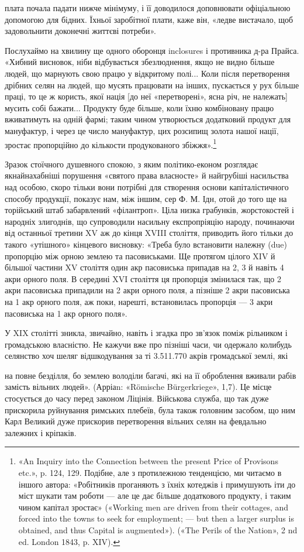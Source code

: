 плата почала падати нижче мінімуму, і її доводилося доповнювати
офіціальною допомогою для бідних. Їхньої заробітної плати,
каже він, «ледве вистачало, щоб задовольнити доконечні життєві
потреби».

Послухаймо на хвилину ще одного оборонця inclosures і противника
д-ра Прайса. «Хибний висновок, ніби відбувається
збезлюднення, якщо не видно більше людей, що марнують свою
працю у відкритому полі... Коли після перетворення дрібних
селян на людей, що мусять працювати на інших, пускається у
рух більше праці, то це ж користь, якої нація [до неї «перетворені»,
ясна річ, не належать] мусить собі бажати... Продукту
буде більше, коли їхню комбіновану працю вживатимуть на
одній фармі; таким чином утворюється додатковий продукт для
мануфактур, і через це число мануфактур, цих розсипищ золота
нашої нації, зростає пропорційно до кількости продукованого
збіжжя».\footnote{
«An Inquiry into the Connection between the present Price of
Provisons etc.», p. 124, 129. Подібне, але з протилежною тенденцією, ми
читаємо в іншого автора: «Робітників проганяють з їхніх котеджів і
примушують іти до міст шукати там роботи — але це дає більше додаткового
продукту, і таким чином капітал зростає» («Working men are driven
from their cottages, and forced into the towns to seek for employment; —
but then a larger surplus is obtained, and thus Capital is augmented»).
(«The Perils of the Nation», 2 nd ed. London 1843, p. XIV).
}

Зразок стоїчного душевного спокою, з яким політико-економ
розглядає якнайнахабніші порушення «святого права власносте»
й найгрубіші насильства над особою, скоро тільки вони
потрібні для створення основи капіталістичного способу продукції,
показує нам, між іншим, сер Ф. М. Ідн, отой до того
ще на торійський штаб забарвлений «філантроп». Ціла низка грабунків,
жорстокостей і народніх злигоднів, що супроводили насильну
експропріяцію народу, починаючи від останньої третини
XV аж до кінця XVIII століття, приводить його тільки до
такого «утішного» кінцевого висновку: «Треба було встановити
належну (due) пропорцію між орною землею та пасовиськами.
Ще протягом цілого XIV й більшої частини XV століття
один акр пасовиська припадав на 2, 3 й навіть 4 акри орного
поля. В середині XVI століття ця пропорція змінилася так, що
2 акри пасовиська припадили на 2 акри орного поля, а пізніше
2 акри пасовиська на 1 акр орного поля, аж поки, нарешті, встановилась
пропорція — 3 акри пасовиська на 1 акр орного поля».

У XIX столітті зникла, звичайно, навіть і згадка про зв’язок
поміж рільником і громадською власністю. Не кажучи вже
про пізніші часи, чи одержало колибудь селянство хоч шеляг
відшкодування за ті 3.511.770 акрів громадської землі, які

на повне безділля, бо землею володіли багачі, які на її оброблення вживали
рабів замість вільних людей». (Арріаn: «Römische Bürgerkriege»,
1,7). Це місце стосується до часу перед законом Ліцінія. Військова служба,
що так дуже прискорила руйнування римських плебеїв, була також
головним засобом, що ним Карл Великий дуже прискорив перетворення
вільних селян на февдально залежних і кріпаків.
